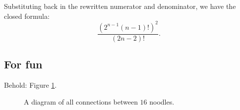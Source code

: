 \documentclass{book}
\begin{document}
Substituting back in the rewritten numerator and denominator, we have the closed formula:
\[
\frac{(2^{n-1}(n-1)!)^2}{(2n-2)!}.
\]

\newpage
\subsection*{For fun}
Behold: Figure \ref{big}.
\begin{figure}[H]
  \centering
  \caption{A diagram of all connections between $16$ noodles.}\label{big}
  \end{figure}
\end{document}
